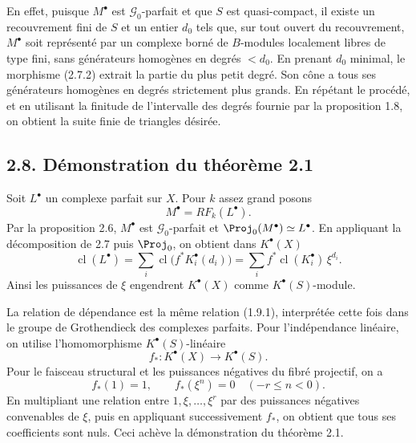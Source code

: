 \documentclass[11pt]{article}
\newcommand{\cl}{\operatorname{cl}}
\begin{document}
En effet, puisque \(M^\bullet\) est \(\mathcal G_0\)-parfait et que \(S\) est quasi-compact, il existe un recouvrement fini de \(S\) et un entier \(d_0\) tels que, sur tout ouvert du recouvrement, \(M^\bullet\) soit représenté par un complexe borné de \(B\)-modules localement libres de type fini, sans générateurs homogènes en degrés \(<d_0\). En prenant \(d_0\) minimal, le morphisme (2.7.2) extrait la partie du plus petit degré. Son cône a tous ses générateurs homogènes en degrés strictement plus grands. En répétant le procédé, et en utilisant la finitude de l'intervalle des degrés fournie par la proposition 1.8, on obtient la suite finie de triangles désirée.

\subsection*{2.8. Démonstration du théorème 2.1}
Soit \(L^\bullet\) un complexe parfait sur \(X\). Pour \(k\) assez grand posons
\[
  M^\bullet=RF_k(L^\bullet).
\]
Par la proposition 2.6, \(M^\bullet\) est \(\mathcal G_0\)-parfait et \(\Proj_0(M^\bullet)\simeq L^\bullet\). En appliquant la décomposition de 2.7 puis \(\Proj_0\), on obtient dans \(K^\bullet(X)\)
\[
  \cl(L^\bullet)
  =
  \sum_i\cl\bigl(f^*K_i^\bullet(d_i)\bigr)
  =
  \sum_i f^*\cl(K_i^\bullet)\,\xi^{d_i}.
\]
Ainsi les puissances de \(\xi\) engendrent \(K^\bullet(X)\) comme \(K^\bullet(S)\)-module.

La relation de dépendance est la même relation (1.9.1), interprétée cette fois dans le groupe de Grothendieck des complexes parfaits. Pour l'indépendance linéaire, on utilise l'homomorphisme \(K^\bullet(S)\)-linéaire
\[
  f_*:K^\bullet(X)\longrightarrow K^\bullet(S).
\]
Pour le faisceau structural et les puissances négatives du fibré projectif, on a
\[
  f_*(1)=1,\qquad f_*(\xi^n)=0\quad(-r\leq n<0).
\]
En multipliant une relation entre \(1,\xi,\ldots,\xi^r\) par des puissances négatives convenables de \(\xi\), puis en appliquant successivement \(f_*\), on obtient que tous ses coefficients sont nuls. Ceci achève la démonstration du théorème 2.1.
\end{document}
